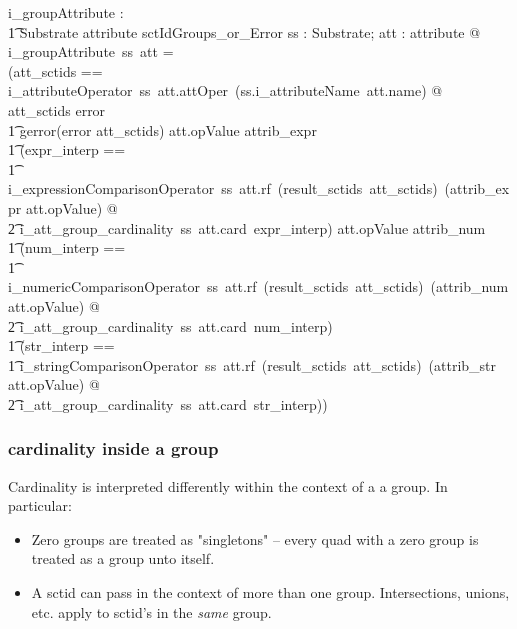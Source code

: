 \documentclass{article}
\begin{document}
\begin{gendef}
   i\_groupAttribute : \\
\t1 Substrate  \fun attribute \fun sctIdGroups\_or\_Error 
\where
   \forall ss : Substrate; att : attribute @ \\
   i\_groupAttribute~ss~att = \\
   (\LET att\_sctids == i\_attributeOperator~ss~att.attOper~(ss.i\_attributeName~att.name) @ \\
   \IF att\_sctids \in \ran error \\
\t1 \THEN gerror(error \inv att\_sctids)
\also
   \ELSE \IF att.opValue \in \ran attrib\_expr \THEN \\
\t1 (\LET expr\_interp == \\
\t1 i\_expressionComparisonOperator~ss~att.rf~(result\_sctids~att\_sctids)~(attrib\_expr \inv att.opValue)  @ \\
\t2 i\_att\_group\_cardinality~ss~att.card~expr\_interp)
\also
   \ELSE \IF att.opValue \in \ran attrib\_num  \THEN \\
\t1 (\LET num\_interp == \\
\t1 i\_numericComparisonOperator~ss~att.rf~(result\_sctids~att\_sctids)~(attrib\_num \inv att.opValue)  @ \\
\t2 i\_att\_group\_cardinality~ss~att.card~num\_interp)
\also
   \ELSE  \\
\t1 (\LET str\_interp == \\
\t1 i\_stringComparisonOperator~ss~att.rf~(result\_sctids~att\_sctids)~(attrib\_str \inv att.opValue)  @ \\
\t2 i\_att\_group\_cardinality~ss~att.card~str\_interp))
\end{gendef}

\subsubsection{cardinality inside a group}

Cardinality is interpreted differently within the context of a a group.  In particular:
\begin{itemize}[noitemsep]
\item Zero groups are treated as "singletons" -- every quad with a zero group is treated as a group unto itself.
\item A sctid can pass in the context of more than one group.  Intersections, unions, etc. apply to sctid's in the \emph{same} group.
\end{itemize}
\end{document}
